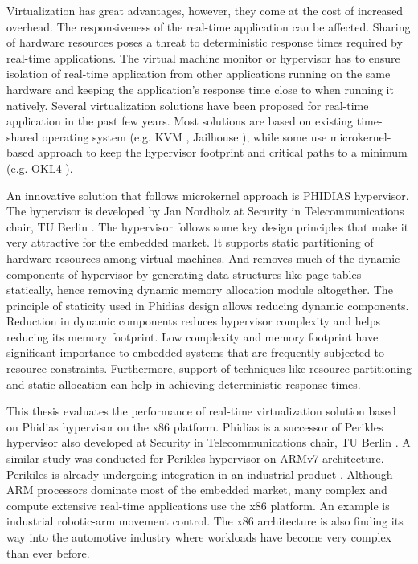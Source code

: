 Virtualization has great advantages, however, they come at the cost of increased overhead.
The responsiveness of the real-time application can be affected. 
Sharing of hardware resources poses a threat to deterministic response times required by real-time applications. 
The virtual machine monitor or hypervisor has to ensure isolation of real-time application from
other applications running on the same hardware and keeping the application's response time 
close to when running it natively. Several virtualization solutions have been proposed for real-time application
in the past few years. Most solutions are based on existing time-shared operating system (e.g. KVM \cite{kivity2007kvm}, Jailhouse \cite{jailhouse}), while some 
use microkernel-based approach to keep the hypervisor footprint and critical paths to a minimum (e.g. OKL4 \cite{okl4_online}).

An innovative solution that follows microkernel approach is PHIDIAS hypervisor. 
The hypervisor is developed by Jan Nordholz at Security in Telecommunications chair, TU Berlin  \cite{nordholz2017design}.
The hypervisor follows some key design principles that make it very attractive for the embedded market.
It supports static partitioning of hardware resources among virtual machines.
And removes much of the dynamic components of hypervisor by generating data structures like page-tables statically, hence removing dynamic memory allocation module altogether.
The principle of staticity used in Phidias design allows reducing dynamic components.
Reduction in dynamic components reduces hypervisor complexity and helps reducing its memory footprint.
Low complexity and memory footprint have significant importance to embedded systems that are frequently subjected to resource constraints.
Furthermore, support of techniques like resource partitioning and static allocation can help in achieving deterministic response times. 

This thesis evaluates the performance of real-time virtualization solution based on Phidias hypervisor on the x86 platform.
Phidias is a successor of Perikles hypervisor also developed at Security in Telecommunications chair, TU Berlin \cite{secT_institut}.
A similar study was conducted for Perikles hypervisor on ARMv7 architecture.
Perikiles is already undergoing integration in an industrial product \cite{opensynergy_coqos}.
Although ARM processors dominate most of the embedded market, many complex and compute extensive real-time applications use the x86 platform. 
An example is industrial robotic-arm movement control. 
The x86 architecture is also finding its way into the automotive industry where workloads have become very complex than ever before.

